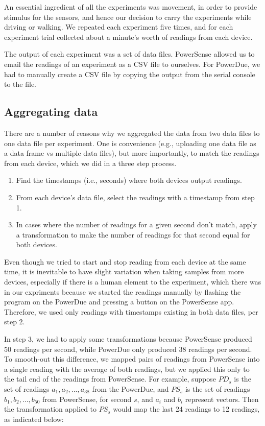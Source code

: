 \documentclass[journal]{IEEEtranTIE}
\begin{document}
An essential ingredient of all the experiments was movement, in order to provide
stimulus for the sensors, and hence our decision to carry the experiments while
driving or walking. We repeated each experiment five times, and for each
experiment trial collected about a minute's worth of readings from each device.

The output of each experiment was a set of data files. PowerSense allowed us to
email the readings of an experiment as a CSV file to ourselves. For PowerDue, we
had to manually create a CSV file by copying the output from the serial console
to the file.

\subsection{Aggregating data}

There are a number of reasons why we aggregated the data from two data files to
one data file per experiment. One is convenience (e.g., uploading one data file
as a data frame vs multiple data files), but more importantly, to match the
readings from each device, which we did in a three step process.

\begin{enumerate}
\item Find the timestamps (i.e., seconds) where both devices output readings.
\item From each device's data file, select the readings with a timestamp from
      step 1.
\item In cases where the number of readings for a given second don't match,
      apply a transformation to make the number of readings for that second
      equal for both devices.
\end{enumerate}

Even though we tried to start and stop reading from each device at the same
time, it is inevitable to have slight variation when taking samples from more
devices, especially if there is a human element to the experiment, which there
was in our expriments because we started the readings manually by flashing the
program on the PowerDue and pressing a button on the PowerSense app.
Therefore, we used only readings with timestamps existing in both data files,
per step 2.

In step 3, we had to apply some transformations because PowerSense produced 50
readings per second, while PowerDue only produced 38 readings per second. To
smooth-out this difference, we mapped pairs of readings from PowerSense into a
single reading with the average of both readings, but we applied this only to
the tail end of the readings from PowerSense. For example, suppose $PD_s$ is the
set of readings $a_1, a_2, ..., a_{38}$ from the PowerDue, and $PS_s$ is the set
of readings $b_1, b_2, ..., b_{50}$ from PowerSense, for second $s$, and $a_i$
and $b_i$ represent vectors. Then the transformation applied to $PS_s$ would map
the last 24 readings to 12 readings, as indicated below:
\end{document}
